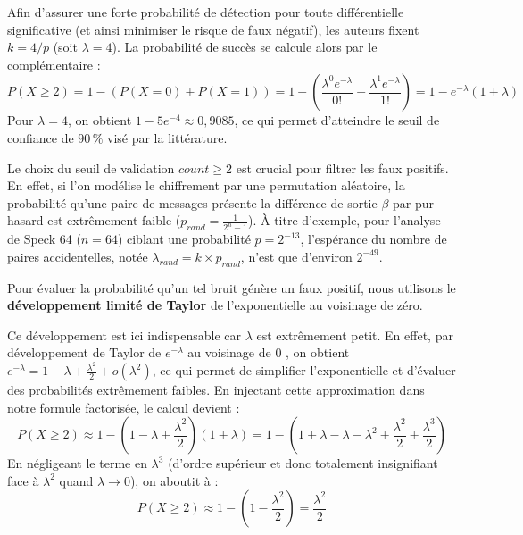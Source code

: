 \documentclass[a4paper,11pt]{article}
\begin{document}
Afin d'assurer une forte probabilité de détection pour toute différentielle significative (et ainsi minimiser le risque de faux négatif), les auteurs fixent $k = 4/p$ (soit $\lambda = 4$). La probabilité de succès se calcule alors par le complémentaire :
\begin{equation*}
    P(X \ge 2) = 1 - (P(X = 0) + P(X = 1)) = 1 - \left(\frac{\lambda^0 e^{-\lambda}}{0!} + \frac{\lambda^1 e^{-\lambda}}{1!}\right) = 1 - e^{-\lambda}(1+\lambda)
\end{equation*}
Pour $\lambda = 4$, on obtient $1 - 5e^{-4} \approx 0,9085$, ce qui permet d'atteindre le seuil de confiance de $90\,\%$ visé par la littérature.

\vspace{0.5cm}

Le choix du seuil de validation $count \ge 2$ est crucial pour filtrer les faux positifs. En effet, si l'on modélise le chiffrement par une permutation aléatoire, la probabilité qu'une paire de messages présente la différence de sortie $\beta$ par pur hasard est extrêmement faible ($p_{rand} = \frac{1}{2^n - 1}$). À titre d'exemple, pour l'analyse de Speck 64 ($n=64$) ciblant une probabilité $p=2^{-13}$, l'espérance du nombre de paires accidentelles, notée $\lambda_{rand} = k \times p_{rand}$, n'est que d'environ $2^{-49}$.

Pour évaluer la probabilité qu'un tel bruit génère un faux positif, nous utilisons le \textbf{développement limité de Taylor} de l'exponentielle au voisinage de zéro.

Ce développement est ici indispensable car $\lambda$ est extrêmement petit. En effet, par développement de Taylor de $e^{-\lambda}$ au voisinage de $0$ \cite{Ramis13}, on obtient $e^{-\lambda} = 1 - \lambda + \frac{\lambda^2}{2} + o(\lambda^2)$, ce qui permet de simplifier l'exponentielle et d'évaluer des probabilités extrêmement faibles. En injectant cette approximation dans notre formule factorisée, le calcul devient :
\begin{equation*}
    P(X \ge 2) \approx 1 - \left(1 - \lambda + \frac{\lambda^2}{2}\right)(1 + \lambda) = 1 - \left(1 + \lambda - \lambda - \lambda^2 + \frac{\lambda^2}{2} + \frac{\lambda^3}{2}\right)
\end{equation*}
En négligeant le terme en $\lambda^3$ (d'ordre supérieur et donc totalement insignifiant face à $\lambda^2$ quand $\lambda \to 0$), on aboutit à :
\begin{equation*}
    P(X \ge 2) \approx 1 - \left(1 - \frac{\lambda^2}{2}\right) = \frac{\lambda^2}{2}
\end{equation*}
\end{document}

